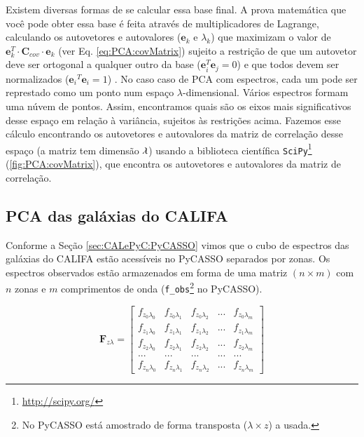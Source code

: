 Existem diversas formas de se calcular essa base final. A prova matemática que
você pode obter essa base é feita através de multiplicadores de Lagrange,
calculando os autovetores e autovalores ($\mathbf{e}{}_k$ e $\lambda_k$) que
maximizam o valor de $\mathbf{e}{}_k^T \cdot \mathbf{C}{}_{cov} \cdot
\mathbf{e}{}_k$ (ver Eq. \ref{eq:PCA:covMatrix}) sujeito a restrição de que um
autovetor deve ser ortogonal a qualquer outro da base ($\mathbf{e}{}_i^T
\mathbf{e}{}_j = 0$) e que todos devem ser normalizados ($\mathbf{e}{}_i{}^T
\mathbf{e}{}_i = 1$) \citep[][p. 5-6]{JolliffePCA1986}. No caso caso de PCA com
espectros, cada um pode ser represtado como um ponto num espaço
$\lambda$-dimensional. Vários espectros formam uma núvem de pontos. Assim,
encontramos quais são os eixos mais significativos desse espaço em relação à
variância, sujeitos às restrições acima. Fazemos esse cálculo encontrando os
autovetores e autovalores da matriz de correlação desse espaço (a matriz tem
dimensão $\lambda \time \lambda$) usando a biblioteca científica
\texttt{SciPy}\footnote{\url{http://scipy.org/}} (\ref{fig:PCA:covMatrix}), que
encontra os autovetores e autovalores da matriz de correlação.

\subsection{PCA das galáxias do CALIFA}

Conforme a Seção \ref{sec:CALePyC:PyCASSO} vimos que o cubo de espectros das
galáxias do CALIFA estão acessíveis no PyCASSO separados por zonas. Os espectros
observados estão armazenados em forma de uma matriz $(n \times m)$ com $n$ zonas
e $m$ comprimentos de onda (\texttt{f\_obs}\footnote{No PyCASSO está amostrado
de forma transposta ($\lambda \times z$) a usada.} no PyCASSO). 

\begin{equation}
    \label{eq:PCA:fluxMatrix}
    \textbf{F}{}_{z \lambda} = \left[
    \begin{array}{ccccc}
        f_{z_0 \lambda_0} & f_{z_0 \lambda_1} & f_{z_0 \lambda_2} & ... & f_{z_0 \lambda_m} \\
        f_{z_1 \lambda_0} & f_{z_1 \lambda_1} & f_{z_1 \lambda_2} & ... & f_{z_1 \lambda_m} \\
        f_{z_2 \lambda_0} & f_{z_2 \lambda_1} & f_{z_2 \lambda_2} & ... & f_{z_2 \lambda_m} \\
        ...               & ...               & ...               & ... & ...               \\
        f_{z_n \lambda_0} & f_{z_n \lambda_1} & f_{z_n \lambda_2} & ... & f_{z_n \lambda_m} 
    \end{array} 
    \right]
\end{equation}

